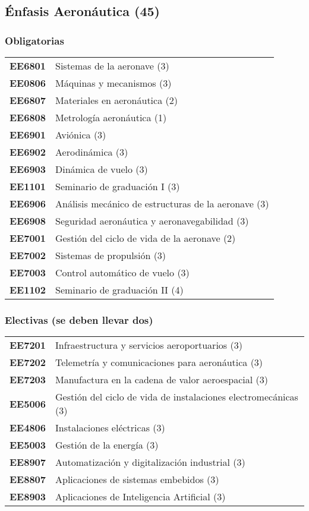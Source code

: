 \documentclass[letterpaper]{article}%
\begin{document}
%
\subsection*{Énfasis Aeronáutica (45)}%
\label{subsec:nfasisAeronutica(45)}%
\subsubsection*{Obligatorias}%
\label{ssubsec:Obligatorias}%
\vspace*{0.2cm}%
\begin{tabularx}{\textwidth}{p{1.5cm}p{10cm}}%
\textbf{EE6801}&Sistemas de la aeronave (3)\\%
\textbf{EE0806}&Máquinas y mecanismos (3)\\%
\textbf{EE6807}&Materiales en aeronáutica (2)\\%
\textbf{EE6808}&Metrología aeronáutica (1)\\%
\textbf{EE6901}&Aviónica (3)\\%
\textbf{EE6902}&Aerodinámica (3)\\%
\textbf{EE6903}&Dinámica de vuelo (3)\\%
\textbf{EE1101}&Seminario de graduación I (3)\\%
\textbf{EE6906}&Análisis mecánico de estructuras de la aeronave (3)\\%
\textbf{EE6908}&Seguridad aeronáutica y aeronavegabilidad (3)\\%
\textbf{EE7001}&Gestión del ciclo de vida de la aeronave (2)\\%
\textbf{EE7002}&Sistemas de propulsión (3)\\%
\textbf{EE7003}&Control automático de vuelo (3)\\%
\textbf{EE1102}&Seminario de graduación II (4)\\%
\end{tabularx}

%
\subsubsection*{Electivas (se deben llevar dos)}%
\label{ssubsec:Electivas(sedebenllevardos)}%
\vspace*{0.2cm}%
\begin{tabularx}{\textwidth}{p{1.5cm}p{10cm}}%
\textbf{EE7201}&Infraestructura y servicios aeroportuarios (3)\\%
\textbf{EE7202}&Telemetría y comunicaciones para aeronáutica (3)\\%
\textbf{EE7203}&Manufactura en la cadena de valor aeroespacial (3)\\%
\textbf{EE5006}&Gestión del ciclo de vida de instalaciones electromecánicas (3)\\%
\textbf{EE4806}&Instalaciones eléctricas (3)\\%
\textbf{EE5003}&Gestión de la energía (3)\\%
\textbf{EE8907}&Automatización y digitalización industrial (3)\\%
\textbf{EE8807}&Aplicaciones de sistemas embebidos (3)\\%
\textbf{EE8903}&Aplicaciones de Inteligencia Artificial (3)\\%
\end{tabularx}
\end{document}
